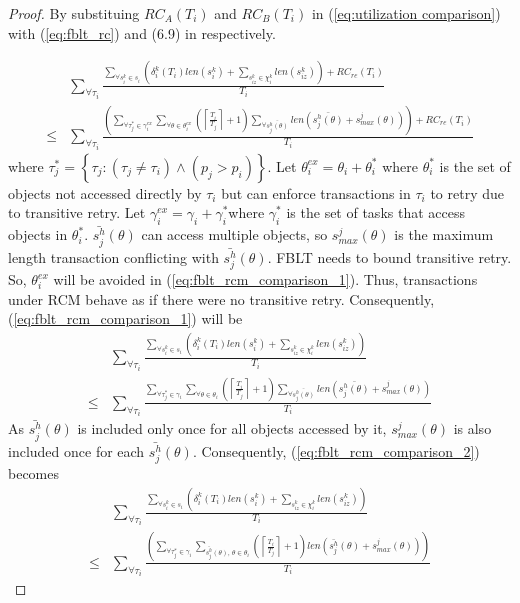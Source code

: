 \documentclass[12pt,english]{report}
\newtheorem{proof}{Proof}
\begin{document}
\begin{proof}

By substituing $RC_{A}(T_{i})$ and $RC_{B}(T_{i})$ in (\ref{eq:utilization comparison})
with (\ref{eq:fblt_rc}) and (6.9) in \cite{shambake_phd_proposal}
respectively. 

\begin{eqnarray}
 & \sum_{\forall\tau_{i}}\frac{\sum_{\forall s_{i}^{k}\in s_{i}}\left(\delta_{i}^{k}(T_{i})len(s_{i}^{k})+\sum_{s_{iz}^k\in \chi_i^k} len(s_{iz}^{k})\right)+RC_{re}(T_{i})}{T_{i}}\label{eq:fblt_rcm_comparison_1}\\
\le & \sum_{\forall\tau_{i}}\frac{\left(\sum_{\forall\tau_{j}^{*}\in\gamma_{i}^{ex}}\sum_{\forall\theta\in\theta_{i}^{ex}}\left(\left\lceil \frac{T_{i}}{T_{j}}\right\rceil +1\right)\sum_{\forall\bar{s_{j}^{h}(\theta)}}len\left(\bar{s_{j}^{h}(\theta)}+s_{max}^{j}(\theta)\right)\right)+RC_{re}(T_{i})}{T_{i}}\nonumber 
\end{eqnarray}
where $\tau_{j}^{*}=\left\{ \tau_{j}:\left(\tau_{j}\ne\tau_{i}\right)\wedge\left(p_{j}>p_{i}\right)\right\} $.
Let $\theta_{i}^{ex}=\theta_{i}+\theta_{i}^{*}$ where $\theta_{i}^{*}$
is the set of objects not accessed directly by $\tau_{i}$ but can
enforce transactions in $\tau_{i}$ to retry due to transitive retry.
Let $\gamma_{i}^{ex}=\gamma_{i}+\gamma_{i}^{*}$where $\gamma_{i}^{*}$
is the set of tasks that access objects in $\theta_{i}^{*}$. $\bar{s_{j}^{h}}(\theta)$
can access multiple objects, so $s_{max}^{j}(\theta)$ is the maximum
length transaction conflicting with $\bar{s_{j}^{h}}(\theta)$. FBLT
needs to bound transitive retry. So, $\theta_{i}^{ex}$ will be avoided
in (\ref{eq:fblt_rcm_comparison_1}). Thus, transactions under RCM behave
as if there were no transitive retry. Consequently, (\ref{eq:fblt_rcm_comparison_1})
will be 
\begin{eqnarray}
 & \sum_{\forall\tau_{i}}\frac{\sum_{\forall s_{i}^{k}\in s_{i}}\left(\delta_{i}^{k}(T_{i})len(s_{i}^{k})+\sum_{s_{iz}^k\in \chi_i^k} len(s_{iz}^{k})\right)}{T_{i}}\label{eq:fblt_rcm_comparison_2}\\
\le & \sum_{\forall\tau_{i}}\frac{\sum_{\forall\tau_{j}^{*}\in\gamma_{i}}\sum_{\forall\theta\in\theta_{i}}\left(\left\lceil \frac{T_{i}}{T_{j}}\right\rceil +1\right)\sum_{\forall\bar{s_{j}^{h}(\theta)}}len\left(\bar{s_{j}^{h}(\theta)}+s_{max}^{j}(\theta)\right)}{T_{i}}\nonumber 
\end{eqnarray}
As $\bar{s_{j}^{h}}(\theta)$ is included only once for all objects
accessed by it, $s_{max}^{j}(\theta)$ is also included once for each
$\bar{s_{j}^{h}}(\theta)$. Consequently, (\ref{eq:fblt_rcm_comparison_2})
becomes 
\begin{eqnarray}
 & \sum_{\forall\tau_{i}}\frac{\sum_{\forall s_{i}^{k}\in s_{i}}\left(\delta_{i}^{k}(T_{i})len(s_{i}^{k})+\sum_{s_{iz}^k\in \chi_i^k} len(s_{iz}^{k})\right)}{T_{i}}\label{eq:fblt_rcm_comparison_3}\\
\le & 
\sum_{\forall\tau_{i}}\frac{\left(\sum_{\forall\tau_{j}^{*}\in\gamma_{i}}\sum_{\bar{s_{j}^{h}}(\theta),\,\theta\in\theta_{i}}\left(\left\lceil \frac{T_{i}}{T_{j}}\right\rceil +1\right)len\left(\bar{s_{j}^{h}}(\theta)+s_{max}^{j}(\theta)\right)\right)}{T_{i}}\nonumber 
\end{eqnarray}


\end{proof}
\end{document}
